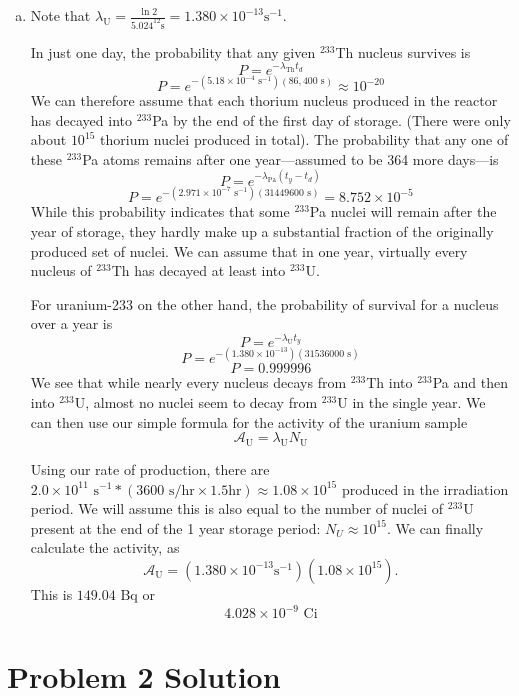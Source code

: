 \documentclass{report}
\begin{document}
\begin{enumerate}[a)]
\item 

Note that $\lambda_{\text{U}} = \frac{\ln 2}{5.024^{12}\text{s}} = 1.380\times10^{-13}\text{s}^{-1}$. 

In just one day, the probability that any given $^{233}$Th nucleus survives is
$$ P = e^{-\lambda_{\text{Th}}t_d} $$
$$ P = e^{-(5.18\times10^{-4}\text{ s}^{-1})(86,400\text{ s})} \approx 10^{-20} $$
We can therefore assume that each thorium nucleus produced in the reactor has decayed into $^{233}$Pa by the end of the first day of storage. (There were only about $10^{15}$ thorium nuclei produced in total).
The probability that any one of these $^{233}$Pa atoms remains after one year---assumed to be 364 more days---is
$$ P = e^{-\lambda_{\text{Pa}}(t_y-t_d)} $$
$$ P = e^{-(2.971\times10^{-7}\text{ s}^{-1})(31449600\text{ s})} = 8.752\times10^{-5}  $$
While this probability indicates that some $^{233}$Pa nuclei will remain after the year of storage, they hardly make up a substantial fraction of the originally produced set of nuclei. We can assume that in one year, virtually every nucleus of $^{233}$Th has decayed at least into $^{233}$U.  

For uranium-233 on the other hand, the probability of survival for a nucleus over a year is
$$ P = e^{-\lambda_{\text{U}}t_y} $$
$$ P = e^{-(1.380\times10^{-13})(31536000\text{ s})} $$
$$ P = 0.999996 $$
We see that while nearly every nucleus decays from $^{233}$Th into $^{233}$Pa and then into $^{233}$U, almost no nuclei seem to decay from $^{233}$U in the single year.
We can then use our simple formula for the activity of the uranium sample
$$ \mathcal{A}_{\text{U}} = \lambda_{\text{U}} N_{\text{U}}$$

Using our rate of production, there are $2.0\times10^{11}\text{ s}^{-1}*(3600\text{ s/hr}\times 1.5 \text{hr}) \approx 1.08\times10^{15}$ produced in the irradiation period. We will assume this is also equal to the number of nuclei of $^{233}$U present at the end of the 1 year storage period: $N_U \approx 10^{15}$. We can finally calculate the activity, as 
$$ \mathcal{A}_{\text{U}} = (1.380\times10^{-13}\text{s}^{-1})(1.08\times10^{15}) .$$
This is ${149.04}\text{ Bq}$ or 
$$\boxed{ 4.028\times10^{-9}\text{ Ci} }$$
\end{enumerate}


\newpage


\section*{Problem 2 Solution}
\end{document}

